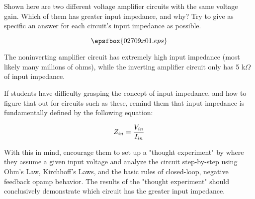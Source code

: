 

Shown here are two different voltage amplifier circuits with the same voltage gain.  Which of them has greater input impedance, and why?  Try to give as specific an answer for each circuit's input impedance as possible.

$$\epsfbox{02709x01.eps}$$







The noninverting amplifier circuit has extremely high input impedance (most likely many millions of ohms), while the inverting amplifier circuit only has 5 k$\Omega$ of input impedance.







If students have difficulty grasping the concept of input impedance, and how to figure that out for circuits such as these, remind them that input impedance is fundamentally defined by the following equation:

$$Z_{in} = {V_{in} \over I_{in}}$$

With this in mind, encourage them to set up a "thought experiment" by where they assume a given input voltage and analyze the circuit step-by-step using Ohm's Law, Kirchhoff's Laws, and the basic rules of closed-loop, negative feedback opamp behavior.  The results of the "thought experiment" should conclusively demonstrate which circuit has the greater input impedance.




